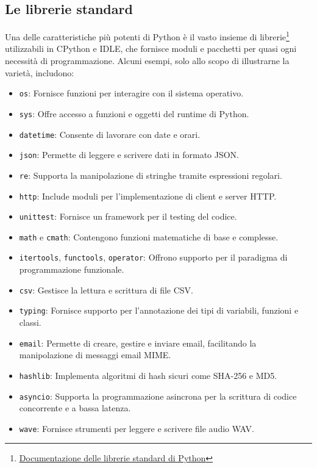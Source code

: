 \documentclass[
  letterpaper,
]{scrbook}
\providecommand{\tightlist}{%
  \setlength{\itemsep}{0pt}\setlength{\parskip}{0pt}}\usepackage{longtable,booktabs,array}
\begin{document}
\subsection{Le librerie standard}\label{le-librerie-standard}

Una delle caratteristiche più potenti di Python è il vasto insieme di
librerie\footnote{\href{https://docs.python.org/3/library/index.html}{Documentazione
  delle librerie standard di Python}} utilizzabili in CPython e IDLE,
che fornisce moduli e pacchetti per quasi ogni necessità di
programmazione. Alcuni esempi, solo allo scopo di illustrarne la
varietà, includono:

\begin{itemize}
\tightlist
\item
  \texttt{os}: Fornisce funzioni per interagire con il sistema
  operativo.
\item
  \texttt{sys}: Offre accesso a funzioni e oggetti del runtime di
  Python.
\item
  \texttt{datetime}: Consente di lavorare con date e orari.
\item
  \texttt{json}: Permette di leggere e scrivere dati in formato JSON.
\item
  \texttt{re}: Supporta la manipolazione di stringhe tramite espressioni
  regolari.
\item
  \texttt{http}: Include moduli per l'implementazione di client e server
  HTTP.
\item
  \texttt{unittest}: Fornisce un framework per il testing del codice.
\item
  \texttt{math} e \texttt{cmath}: Contengono funzioni matematiche di
  base e complesse.
\item
  \texttt{itertools}, \texttt{functools}, \texttt{operator}: Offrono
  supporto per il paradigma di programmazione funzionale.
\item
  \texttt{csv}: Gestisce la lettura e scrittura di file CSV.
\item
  \texttt{typing}: Fornisce supporto per l'annotazione dei tipi di
  variabili, funzioni e classi.
\item
  \texttt{email}: Permette di creare, gestire e inviare email,
  facilitando la manipolazione di messaggi email MIME.
\item
  \texttt{hashlib}: Implementa algoritmi di hash sicuri come SHA-256 e
  MD5.
\item
  \texttt{asyncio}: Supporta la programmazione asincrona per la
  scrittura di codice concorrente e a bassa latenza.
\item
  \texttt{wave}: Fornisce strumenti per leggere e scrivere file audio
  WAV.
\end{itemize}
\end{document}
